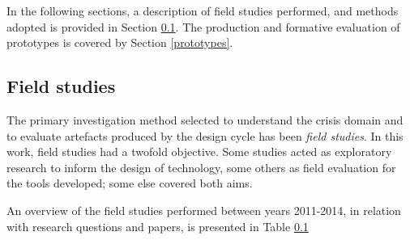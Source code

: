 In the following sections, a description of field studies performed, and methods adopted is provided in Section \ref{field-studies}. The production and formative evaluation of prototypes is covered by Section \ref{prototypes}.

\subsection{Field studies}\label{field-studies}

The primary investigation method selected to understand the crisis domain and to evaluate artefacts produced by the design cycle has been \emph{field studies}. In this work, field studies had a twofold objective. Some studies acted as exploratory research to inform the design of technology, some others as field evaluation for the tools developed; some else covered both aims.

An overview of the field studies performed between years 2011-2014, in relation with research questions and papers, is presented in Table \ref{field-studies}


